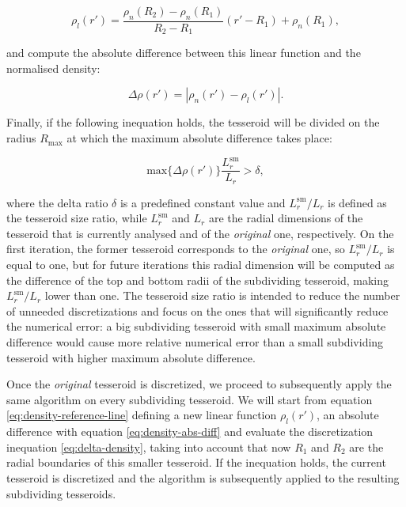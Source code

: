 \documentclass[extra]{gji}
\begin{document}
\begin{equation}
    \rho_l(r') =
    \frac{ \rho_n(R_2) - \rho_n(R_1) }{ R_2 - R_1 } (r' - R_1) + \rho_n(R_1),
    \label{eq:density-reference-line}
\end{equation}

\noindent and compute the absolute difference between this linear 
function and the normalised density:

\begin{equation}
    \Delta \rho (r') = | \rho_n(r') - \rho_l(r') |.
    \label{eq:density-abs-diff}
\end{equation}

Finally, if the following inequation holds, the tesseroid will be divided on 
the radius $R_\text{max}$ at which the maximum absolute difference takes 
place:

\begin{equation}
    \text{max}\{ \Delta \rho(r') \} \frac{L_r^\text{sm}}{L_r} > \delta,
    \label{eq:delta-density}
\end{equation}

\noindent where the delta ratio $\delta$ is a predefined constant value and 
$L_r^\text{sm}/L_r$ is defined as the tesseroid size ratio, while 
$L_r^\text{sm}$ and $L_r$ are the radial dimensions of the tesseroid that is 
currently analysed and of the \emph{original} one, respectively.
On the first iteration, the former tesseroid corresponds to the 
\emph{original} one, so $L_r^\text{sm}/L_r$ is equal to one, but for 
future iterations this radial dimension will be computed as the 
difference of the top and bottom radii of the subdividing tesseroid, making 
$L_r^\text{sm}/L_r$ lower than one.
The tesseroid size ratio is intended to reduce the number of unneeded 
discretizations and focus on the ones that will significantly reduce the 
numerical error:
a big subdividing tesseroid with small maximum absolute difference would 
cause more relative numerical error than a small subdividing tesseroid with 
higher maximum absolute difference.

Once the \emph{original} tesseroid is discretized, we proceed to 
subsequently apply the same algorithm on every subdividing tesseroid.
We will start from equation \ref{eq:density-reference-line} defining a 
new linear function $\rho_l(r')$, an absolute difference with equation 
\ref{eq:density-abs-diff} and evaluate the discretization inequation 
\ref{eq:delta-density}, taking into account that now $R_1$ and $R_2$ 
are the radial boundaries of this smaller tesseroid.
If the inequation holds, the current tesseroid is discretized and the 
algorithm is subsequently applied to the resulting subdividing tesseroids.
\end{document}
